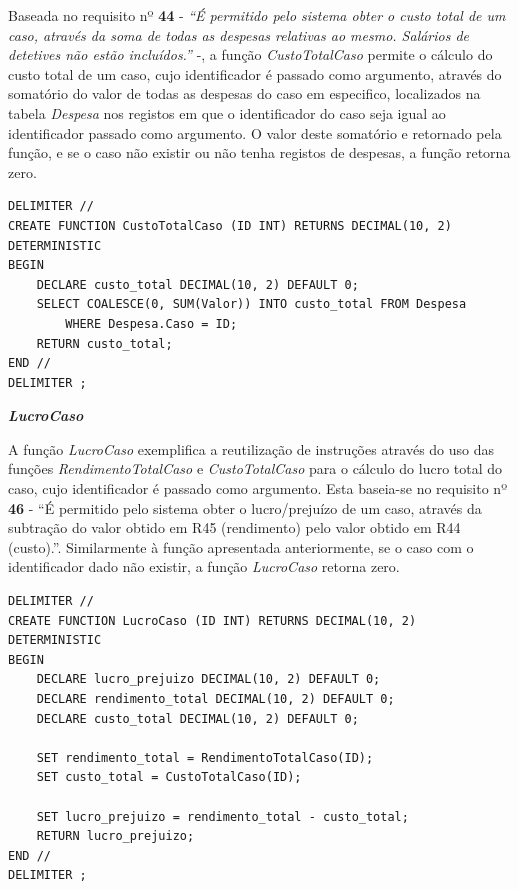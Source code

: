 \documentclass[a4paper,12pt]{scrreprt}
\begin{document}
Baseada no requisito nº \textbf{44} - \textit{“É permitido pelo sistema obter o custo total de um caso, através da soma de todas as despesas relativas ao mesmo. Salários de detetives não estão incluídos.”} -, a função \textit{CustoTotalCaso} permite o cálculo do custo total de um caso, cujo identificador é passado como argumento, através do somatório do valor de todas as despesas do caso em especifico, localizados na tabela \textit{Despesa} nos registos em que o identificador do caso seja igual ao identificador passado como argumento. O valor deste somatório e retornado pela função, e se o caso não existir ou não tenha registos de despesas, a função retorna zero.

\vspace{0.4cm}
\begin{lstlisting}[escapechar=!]
DELIMITER //
CREATE FUNCTION CustoTotalCaso (ID INT) RETURNS DECIMAL(10, 2)
DETERMINISTIC
BEGIN
    DECLARE custo_total DECIMAL(10, 2) DEFAULT 0;
    SELECT COALESCE(0, SUM(Valor)) INTO custo_total FROM Despesa
        WHERE Despesa.Caso = ID;
    RETURN custo_total;
END //
DELIMITER ;
\end{lstlisting}

\clearpage

\textit{\textbf{LucroCaso}}

A função \textit{LucroCaso} exemplifica a reutilização de instruções através do uso das funções \textit{RendimentoTotalCaso} e \textit{CustoTotalCaso} para o cálculo do lucro total do caso, cujo identificador é passado como argumento. Esta baseia-se no requisito nº \textbf{46} - “É permitido pelo sistema obter o lucro/prejuízo de um caso, através da subtração do valor obtido em R45 (rendimento) pelo valor obtido em R44 (custo).”. Similarmente à função apresentada anteriormente, se o caso com o identificador dado não existir, a função \textit{LucroCaso} retorna zero.

\vspace{0.4cm}
\begin{lstlisting}[escapechar=!]
DELIMITER //
CREATE FUNCTION LucroCaso (ID INT) RETURNS DECIMAL(10, 2)
DETERMINISTIC
BEGIN
    DECLARE lucro_prejuizo DECIMAL(10, 2) DEFAULT 0;
    DECLARE rendimento_total DECIMAL(10, 2) DEFAULT 0;
    DECLARE custo_total DECIMAL(10, 2) DEFAULT 0;

    SET rendimento_total = RendimentoTotalCaso(ID);
    SET custo_total = CustoTotalCaso(ID);

    SET lucro_prejuizo = rendimento_total - custo_total;
    RETURN lucro_prejuizo;
END //
DELIMITER ;
\end{lstlisting}
\end{document}
